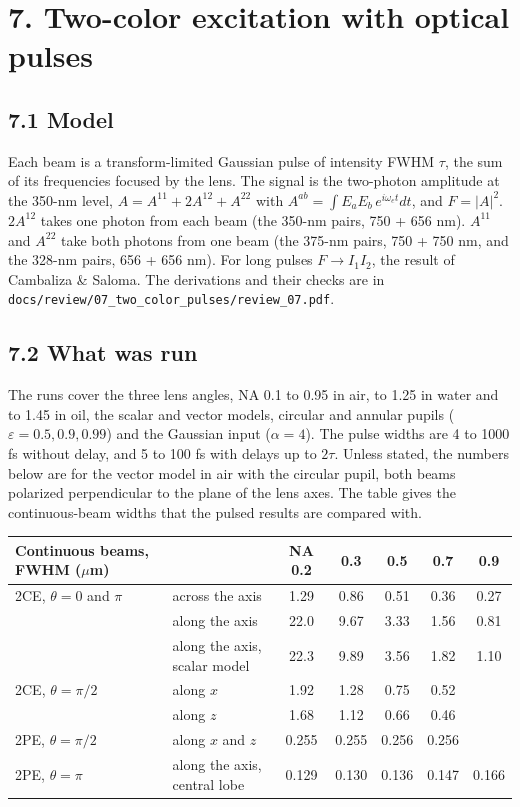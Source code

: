 \documentclass[10pt]{article}
\begin{document}
\section*{7. Two-color excitation with optical pulses}
\subsection*{7.1 Model}
Each beam is a transform-limited Gaussian pulse of intensity FWHM $\tau$, the sum of its frequencies focused by the
lens. The signal is the two-photon amplitude at the 350-nm level,
$A = A^{11} + 2A^{12} + A^{22}$ with $A^{ab} = \int E_aE_b\,e^{i\omega_et}dt$, and $F = |A|^2$. $2A^{12}$ takes one
photon from each beam (the 350-nm pairs, 750 + 656 nm). $A^{11}$ and $A^{22}$ take both photons from one beam (the
375-nm pairs, 750 + 750 nm, and the 328-nm pairs, 656 + 656 nm). For long pulses $F \to I_1I_2$, the result of
Cambaliza \& Saloma. The derivations and their checks are in
\texttt{docs/review/07\_two\_color\_pulses/review\_07.pdf}.

\subsection*{7.2 What was run}
The runs cover the three lens angles, NA 0.1 to 0.95 in air, to 1.25 in water and to 1.45 in oil, the scalar and
vector models, circular and annular pupils ($\varepsilon = 0.5, 0.9, 0.99$) and the Gaussian input
($\alpha = 4$). The pulse widths are 4 to 1000 fs without delay, and 5 to 100 fs with delays up to $2\tau$.
Unless stated, the numbers below are for the vector model in air with the circular pupil, both beams polarized
perpendicular to the plane of the lens axes. The table gives the continuous-beam widths that the pulsed results
are compared with.
\begin{center}\small\begin{tabular}{llccccc}\toprule
Continuous beams, FWHM ($\mu$m) & & NA 0.2 & 0.3 & 0.5 & 0.7 & 0.9\\\midrule
2CE, $\theta = 0$ and $\pi$ & across the axis & 1.29 & 0.86 & 0.51 & 0.36 & 0.27\\
 & along the axis & 22.0 & 9.67 & 3.33 & 1.56 & 0.81\\
 & along the axis, scalar model & 22.3 & 9.89 & 3.56 & 1.82 & 1.10\\
2CE, $\theta = \pi/2$ & along $x$ & 1.92 & 1.28 & 0.75 & 0.52 & \\
 & along $z$ & 1.68 & 1.12 & 0.66 & 0.46 & \\
2PE, $\theta = \pi/2$ & along $x$ and $z$ & 0.255 & 0.255 & 0.256 & 0.256 & \\
2PE, $\theta = \pi$ & along the axis, central lobe & 0.129 & 0.130 & 0.136 & 0.147 & 0.166\\\bottomrule
\end{tabular}\end{center}
\end{document}
